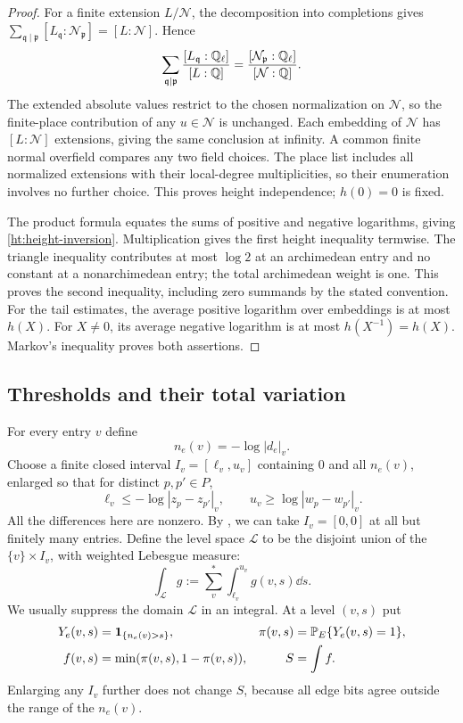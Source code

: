 \begin{proof}
For a finite extension \(L/\mathcal N\), the decomposition into
completions \cite[Proposition~8.2]{ProductFormula} gives
\(\sum_{\mathfrak q\mid\mathfrak p}[L_{\mathfrak q}:\mathcal N_{\mathfrak p}]
=[L:\mathcal N]\). Hence
\[
 \sum_{\mathfrak q\mid\mathfrak p}
 \frac{[L_{\mathfrak q}:\mathbb Q_\ell]}{[L:\mathbb Q]}
 =\frac{[\mathcal N_{\mathfrak p}:\mathbb Q_\ell]}{[\mathcal N:\mathbb Q]}.
\]
The extended absolute values restrict to the chosen normalization on
\(\mathcal N\), so the finite-place contribution of any
\(u\in\mathcal N\) is unchanged. Each embedding of \(\mathcal N\)
has \([L:\mathcal N]\) extensions, giving the same conclusion at
infinity. A common finite normal overfield compares any two field
choices. The place list includes all normalized extensions with their
local-degree multiplicities, so their enumeration involves no further
choice. This proves height independence; \(h(0)=0\) is fixed.

The product formula equates the sums of positive and negative logarithms,
giving \eqref{ht:height-inversion}. Multiplication gives the first height
inequality termwise. The triangle inequality contributes at most $\log2$
at an archimedean entry and no constant at a nonarchimedean entry; the
total archimedean weight is one. This proves the second inequality,
including zero summands by the stated convention. For the tail estimates,
the average positive logarithm over embeddings is at most $h(X)$.
For $X\ne0$, its average negative logarithm is at most $h(X^{-1})=h(X)$.
Markov's inequality proves both assertions.
\end{proof}

\subsection{Thresholds and their total variation}\label{sec:levels}

For every entry $v$ define
\[
 n_e(v)=-\log|d_e|_v.
\]
Choose a finite closed interval $I_v=[\ell_v,u_v]$ containing $0$ and all
$n_e(v)$, enlarged so that for distinct $p,p'\in P$,
\begin{equation}\label{ht:range}
 \ell_v\le-\log|z_p-z_{p'}|_v,\qquad
 u_v\ge\log|w_p-w_{p'}|_v.
\end{equation}
All the differences here are nonzero. By , we can take
$I_v=[0,0]$ at all but finitely many entries. Define the level space
$\mathcal L$ to be the disjoint union of the $\{v\}\times I_v$, with
weighted Lebesgue measure:
\[
 \int_{\mathcal L}g
   :=\sum_v^*\int_{\ell_v}^{u_v}g(v,s)\dd s.
\]
We usually suppress the domain $\mathcal L$ in an integral.
At a level $(v,s)$ put
\begin{equation}\label{ht:levels}
 \begin{aligned}
 Y_e(v,s)&=\mathbf1_{\{n_e(v)>s\}},&
 \pi(v,s)&=\mathbb P_E\{Y_e(v,s)=1\},\\
 f(v,s)&=\min(\pi(v,s),1-\pi(v,s)),& S&=\int f.
 \end{aligned}
\end{equation}
Enlarging any $I_v$ further does not change $S$, because all edge bits
agree outside the range of the $n_e(v)$.

